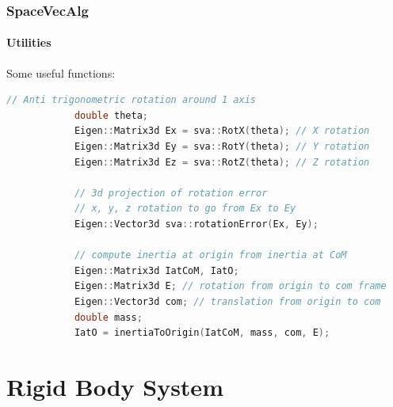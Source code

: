 \documentclass{beamer}
\begin{document}
  	\begin{frame}[fragile]
		\frametitle{SpaceVecAlg}
		\framesubtitle{Utilities}
		Some useful functions:
		\begin{lstlisting}[language=C++]
			// Anti trigonometric rotation around 1 axis
			double theta;
			Eigen::Matrix3d Ex = sva::RotX(theta); // X rotation
			Eigen::Matrix3d Ey = sva::RotY(theta); // Y rotation
			Eigen::Matrix3d Ez = sva::RotZ(theta); // Z rotation

			// 3d projection of rotation error
			// x, y, z rotation to go from Ex to Ey
			Eigen::Vector3d sva::rotationError(Ex, Ey);

			// compute inertia at origin from inertia at CoM
			Eigen::Matrix3d IatCoM, IatO;
			Eigen::Matrix3d E; // rotation from origin to com frame
			Eigen::Vector3d com; // translation from origin to com
			double mass;
			IatO = inertiaToOrigin(IatCoM, mass, com, E);
		\end{lstlisting}
	\end{frame}

	\section{Rigid Body System}
\end{document}

